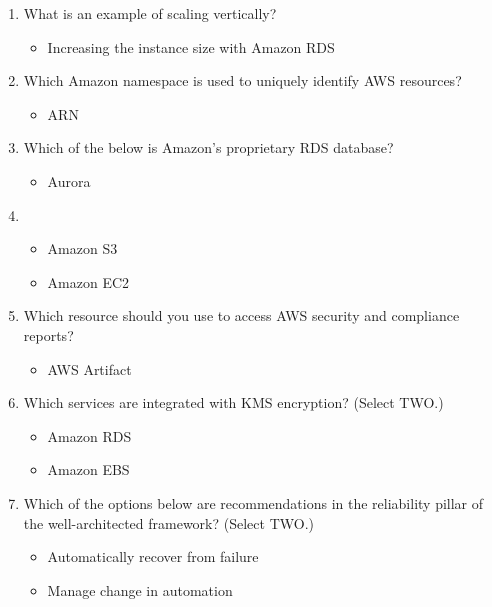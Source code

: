 \begin{enumerate}
	\item What is an example of scaling vertically?

	\begin{itemize}
	\item Increasing the instance size with Amazon RDS
\end{itemize}

	\item Which Amazon namespace is used to uniquely identify AWS resources?

	\begin{itemize}
	\item ARN
\end{itemize}

	\item Which of the below is Amazon's proprietary RDS database?

	\begin{itemize}
	\item Aurora
\end{itemize}

	\item 

	\begin{itemize}
	\item Amazon S3
	\item Amazon EC2
\end{itemize}

	\item Which resource should you use to access AWS security and compliance reports?

	\begin{itemize}
	\item AWS Artifact
\end{itemize}

	\item Which services are integrated with KMS encryption? (Select TWO.)

	\begin{itemize}
	\item Amazon RDS
	\item Amazon EBS
\end{itemize}

	\item Which of the options below are recommendations in the reliability pillar of the well-architected framework? (Select TWO.)

	\begin{itemize}
	\item Automatically recover from failure
	\item Manage change in automation
\end{itemize}


\end{enumerate}
